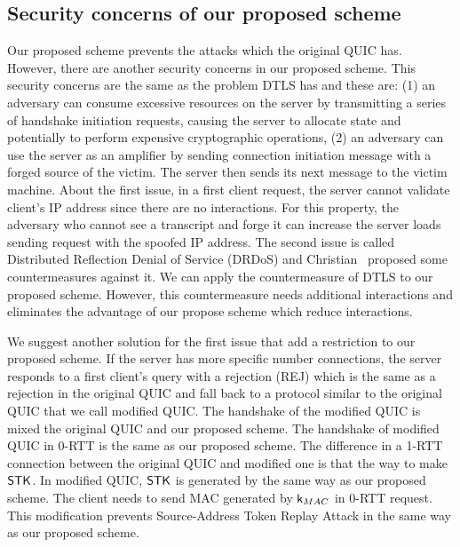 \subsection{Security concerns of our proposed scheme} \label{sec:prop_sec_concerns}

Our proposed scheme prevents the attacks which the original QUIC has.
However, there are another security concerns in our proposed scheme.
This security concerns are the same as the problem DTLS\cite{DTLS12}
has and these are: (1) an adversary can consume excessive resources
on the server by transmitting a series of handshake initiation requests,
causing the server to allocate state and potentially to perform expensive
cryptographic operations, (2) an adversary can use the server as an
amplifier by sending connection initiation message with a forged source
of the victim. The server then sends its next message to the victim
machine.
About the first issue, in a first client request, the server cannot validate
client's IP address since there are no interactions.
For this property, the adversary who cannot see a
transcript and forge it can increase the server loads sending request
with the spoofed IP address.
The second issue is called Distributed Reflection Denial of Service
(DRDoS) and Christian~\cite{Ross14} proposed some countermeasures against it.
We can apply the countermeasure of DTLS to our proposed scheme.
However, this countermeasure needs additional interactions and eliminates
the advantage of our propose scheme which reduce interactions.

We suggest another solution for the first issue that add a restriction to our
proposed scheme.
If the server has more specific number connections, the server
responds to a first client's query with a rejection (REJ) which
is the same as a rejection in the original QUIC and
fall back to a protocol similar to the original QUIC that we call
modified QUIC.
The handshake of the modified QUIC is mixed the original QUIC and our
proposed scheme.
The handshake of modified QUIC in 0-RTT is the same as our proposed
scheme.
The difference in a 1-RTT connection between the original QUIC and modified one
is that the way to make $\mathsf{STK}$. In modified QUIC, $\mathsf{STK}$ is generated
by the same way as our proposed scheme. The client needs to send
MAC generated by $\mathsf{k}_{MAC}$ in 0-RTT request.
This modification prevents Source-Address Token Replay Attack
in the same way as our proposed scheme.